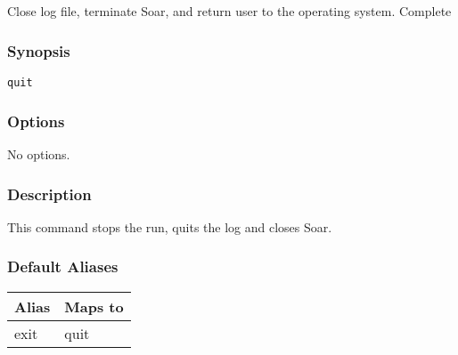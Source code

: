 \subsection{}
\label{quit}
Close log file, terminate Soar, and return user to the operating system. 
 Complete
\subsubsection*{Synopsis}
\begin{verbatim}
quit
\end{verbatim}
\subsubsection*{Options}
 No options. 
\subsubsection*{Description}
 This command stops the run, quits the log and closes Soar. 
\subsubsection*{Default Aliases}
\begin{tabular}{|l|l|}
\hline 
 Alias  & Maps to  \\
 \hline 
 exit  & quit  \\
 \hline 
\end{tabular}
